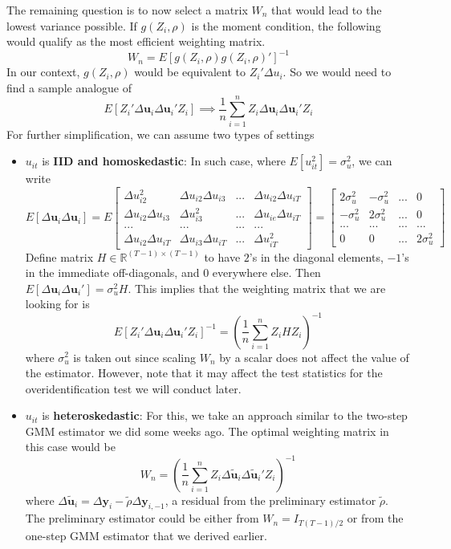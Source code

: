 The remaining question is to now select a matrix $W_n$ that would lead to the lowest variance possible. If $g(Z_i,\rho)$ is the moment condition, the following would qualify as the most efficient weighting matrix.
\[
W_n = E[g(Z_i,\rho)g(Z_i,\rho)']^{-1}
\]
In our context, $g(Z_i,\rho)$ would be equivalent to $Z_i'\Delta u_i$. So we would need to find a sample analogue of
\[
E[Z_i'\Delta \mathbf{u}_i \Delta \mathbf{u}_i'Z_i] \implies \frac{1}{n}\sum_{i=1}^nZ_i\Delta \mathbf{u}_i \Delta \mathbf{u}_i' Z_i
\]
For further simplification, we can assume two types of settings
\begin{itemize}
\item $u_{it}$ is \textbf{IID and homoskedastic}: In such case, where $E[u_{it}^2]=\sigma_u^2$,  we can write
\[
E[\Delta \mathbf{u}_i \Delta \mathbf{u}_i]=E\begin{bmatrix}\Delta u_{i2}^2 & \Delta u_{i2}\Delta u_{i3} & ... & \Delta u_{i2}\Delta u_{iT} \\\Delta u_{i2}\Delta u_{i3} & \Delta u_{i3}^2 & ... & \Delta u_{ie}\Delta u_{iT}\\ ... & ...  & ... & ... \\  \Delta u_{i2}\Delta u_{iT} & \Delta u_{i3}\Delta u_{iT} & ... & \Delta u_{iT}^2  \end{bmatrix}=\begin{bmatrix}2\sigma_u^2& -\sigma_u^2 &... &0\\ -\sigma_u^2 & 2\sigma_u^2 & ... &0 \\ ...&...&...&...\\ 0 & 0 & ... & 2\sigma_u^2\end{bmatrix}
\]
Define matrix $H\in\mathbb{R}^{(T-1)\times(T-1)}$ to have $2$'s in the diagonal elements, $-1$'s in the immediate off-diagonals, and $0$ everywhere else. Then $E[\Delta \mathbf{u}_i \Delta \mathbf{u}_i']=\sigma_u^2 H$. This implies that the weighting matrix that we are looking for is
\[
E[Z_i'\Delta \mathbf{u}_i \Delta \mathbf{u}_i'Z_i]^{-1}=\left(\frac{1}{n}\sum_{i=1}^nZ_iH Z_i\right)^{-1}
\]
where $\sigma_u^2$ is taken out since scaling $W_n$ by a scalar does not affect the value of the estimator. However, note that it may affect the test statistics for the overidentification test we will conduct later. 
\item $u_{it}$ is \textbf{heteroskedastic}: For this, we take an approach similar to the two-step GMM estimator we did some weeks ago. The optimal weighting matrix in this case would be
\[
W_n=\left(\frac{1}{n}\sum_{i=1}^nZ_i\Delta\tilde{\mathbf{u}}_i \Delta\tilde{\mathbf{u}}_i' Z_i\right)^{-1} 
\]
where $\Delta\tilde{\mathbf{u}}_i=\Delta \mathbf{y}_ i -\tilde{\rho}\Delta \mathbf{y}_{i,-1}$, a residual from the preliminary estimator $\tilde{\rho}$. The preliminary estimator could be either from $W_n = I_{T(T-1)/2}$ or from the one-step GMM estimator that we derived earlier. 
\end{itemize}

